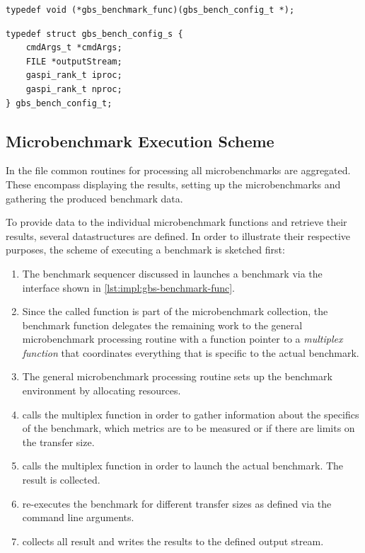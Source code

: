 \begin{lstlisting}[style=cpp,captionpos={b},caption={Definition of the benchmarking function header.},label=lst:impl:gbs-benchmark-func]
typedef void (*gbs_benchmark_func)(gbs_bench_config_t *);
\end{lstlisting}

\begin{lstlisting}[style=cpp,captionpos={b},caption={Definition of the structure \code{gbs\_bench\_config\_t}.},label=lst:impl:gbs-benchmark-config-struct]
typedef struct gbs_bench_config_s {
	cmdArgs_t *cmdArgs;
	FILE *outputStream;
	gaspi_rank_t iproc;
	gaspi_rank_t nproc;
} gbs_bench_config_t;
\end{lstlisting}


\subsection{Microbenchmark Execution Scheme}
\label{ssec:impl:microbenchmark-execution-scheme}

In the file  common routines for processing all microbenchmarks are aggregated. These encompass displaying the results, setting up the microbenchmarks and gathering the produced benchmark data.

To provide data to the individual microbenchmark functions and retrieve their results, several datastructures are defined. In order to illustrate their respective purposes, the scheme of executing a benchmark is sketched first:
\begin{enumerate}
	\item The benchmark sequencer discussed in  launches a benchmark via the interface shown in \autoref{lst:impl:gbs-benchmark-func}.
	\item Since the called function is part of the microbenchmark collection, the benchmark function delegates the remaining work to the general microbenchmark processing routine  with a function pointer to a \emph{multiplex function} that coordinates everything that is specific to the actual benchmark.
	\item The general microbenchmark processing routine \microbenchmarkExecute sets up the benchmark environment by allocating resources.
	\item \microbenchmarkExecute calls the multiplex function in order to gather information about the specifics of the benchmark, \eg which metrics are to be measured or if there are limits on the transfer size.
	\item \microbenchmarkExecute calls the multiplex function in order to launch the actual benchmark. The result is collected.
	\item \microbenchmarkExecute re-executes the benchmark for different transfer sizes as defined via the command line arguments.
	\item \microbenchmarkExecute collects all result and writes the results to the defined output stream.
\end{enumerate}

